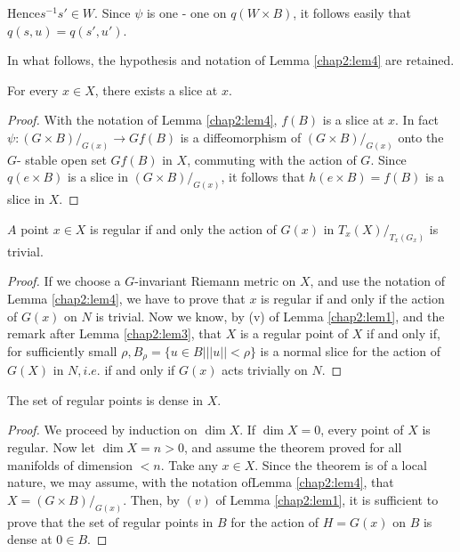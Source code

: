 Hence\pageoriginale $  s^{-1} s' \in W $. Since $ \psi $  is  one -
one on  $ q ( 
W \times B ) $, it follows  easily that  $ q (s, u ) =  q ( s', u' )
$. 

In what follows, the hypothesis and  notation of Lemma
\ref{chap2:lem4} are retained. 

\setcounter{thm}{0}
\begin{thm}\label{chap2:thm1}%
  For  every  $ x \in X $, there exists a  slice at  $x$. 
\end{thm}  

\begin{proof}
  With the notation of  Lemma \ref{chap2:lem4}, $f(B)$ is a slice at $x$. In fact
  $\psi : (G \times B)/_{G (x)} \rightarrow  G  f(B)$ is  a
  diffeomorphism of $(G \times B) /_{ G (x)} $ onto the $G$- stable open
  set $ G f(B)$  in $X$, commuting with the  action of $G$.  Since $ q (
  e \times B ) $  is a  slice in  $ ( G \times B ) /_{G (x)} $, it
  follows that $ h ( e \times B )  =  f (B) $  is a  slice in  $ X $. 
\end{proof}
  
\begin{thm}\label{chap2:thm2}%
  $A$  point $ x \in X $  is regular if and  only the  action of  $ G
  (x) $ in  $ T_x (X) / _{T_x (G_x) } $ is trivial. 
\end{thm}  

\begin{proof}
  If we choose a  $G$-invariant Riemann metric on  $X$, and  use  the
  notation of   Lemma \ref{chap2:lem4}, we have to prove that $x$  is  regular if
  and only if the  action of $ G (x) $ on  $N$  is  trivial. Now we
  know, by (v) of  Lemma \ref{chap2:lem1},  and the remark after
  Lemma \ref{chap2:lem3}, that 
  $X $  is a regular point of  $X$  if and  only if, for sufficiently
  small $ \rho , B_\rho = \{ u \in B  \big|  || u || < \rho \}  $  is
  a normal slice for the action of  $G (X) $ in  $N, i. e $. if and
  only if  $ G (x) $ acts trivially on $N$. 
\end{proof}  

\begin{thm}\label{chap2:thm3}%
  The set of  regular points is dense in  $X$.
\end{thm}  

\begin{proof}
  We proceed by  induction  on $ \dim  X $. If  $ \dim X = 0 $, every
  point of  $ X $ is regular. Now let  $ \dim X =  n >0 $, and  assume
  the theorem proved for all manifolds of   dimension  $ <  n $. Take
  any $ x \in X $. Since  the  theorem is of a  local nature, we may
  assume, with the notation of\pageoriginale Lemma \ref{chap2:lem4},
  that $ X = ( G   \times B )  
  /_{G (x)} $. Then, by $ (v) $ of Lemma \ref{chap2:lem1}, it is  sufficient to
  prove that the set of regular points in $ B$  for  the action of  $ H
  = G (x) $  on  $B$ is dense at  $ 0 \in B $.  
\end{proof}  


